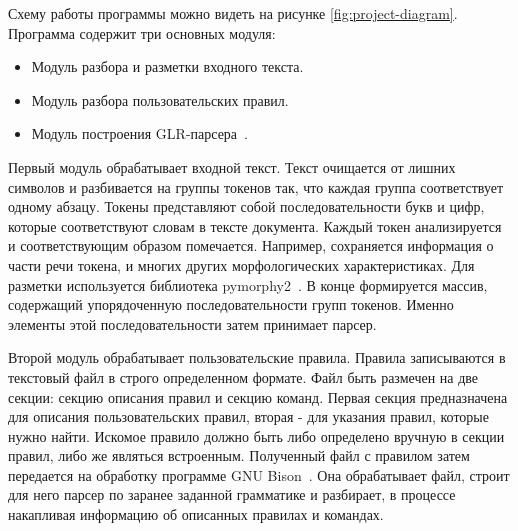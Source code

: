 Схему работы программы можно видеть на рисунке \ref{fig:project-diagram}. Программа содержит три основных модуля: 
\begin{itemize}
  \item Модуль разбора и разметки входного текста.
  \item Модуль разбора пользовательских правил.
  \item Модуль построения GLR-парсера~\autocite{tomita-algorithm}.
\end{itemize}

Первый модуль обрабатывает входной текст. Текст очищается от лишних символов и разбивается на группы токенов так, что каждая группа соответствует одному абзацу. Токены представляют собой последовательности букв и цифр, которые соответствуют словам в тексте документа. Каждый токен анализируется и соответствующим образом помечается. Например, сохраняется информация о части речи токена, и многих других морфологических характеристиках. Для разметки используется библиотека pymorphy2~\autocite{pymorphy2-home}. В конце формируется массив, содержащий упорядоченную последовательности групп токенов. Именно элементы этой последовательности затем принимает парсер.

Второй модуль обрабатывает пользовательские правила. Правила записываются в текстовый файл в строго определенном формате. Файл быть размечен на две секции: секцию описания правил и секцию команд. Первая секция предназначена для описания пользовательских правил, вторая - для указания правил, которые нужно найти. Искомое правило должно быть либо определено вручную в секции правил, либо же являться встроенным. Полученный файл с правилом затем передается на обработку программе GNU Bison~\autocite{bison-home}. Она обрабатывает файл, строит для него парсер по заранее заданной грамматике и разбирает, в процессе накапливая информацию об описанных правилах и командах.

